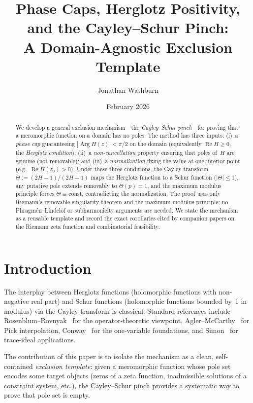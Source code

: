 \documentclass[11pt]{amsart}
\title[Phase Caps and the Cayley--Schur Pinch]{Phase Caps, Herglotz Positivity,\\
and the Cayley--Schur Pinch:\\
A Domain-Agnostic Exclusion Template}
\author{Jonathan Washburn}
\date{February 2026}
\theoremstyle{definition}
\theoremstyle{remark}
\DeclareMathOperator{\re}{Re}
\DeclareMathOperator{\Arg}{Arg}
\begin{document}
\begin{abstract}
We develop a general exclusion mechanism---the \emph{Cayley--Schur pinch}---for
proving that a meromorphic function on a domain has no poles.
The method has three inputs:
(i)~a \emph{phase cap} guaranteeing $|\Arg H(z)|<\pi/2$ on the domain
(equivalently $\re H\ge 0$, the \emph{Herglotz condition});
(ii)~a \emph{non-cancellation} property ensuring that poles of~$H$
are genuine (not removable); and
(iii)~a \emph{normalization} fixing the value at one interior point
(e.g.\ $\re H(z_0)>0$).
Under these three conditions, the Cayley transform
$\Theta:=(2H-1)/(2H+1)$ maps the Herglotz function to a Schur function
($|\Theta|\le 1$), any putative pole extends removably to $\Theta(p)=1$,
and the maximum modulus principle forces $\Theta\equiv\text{const}$,
contradicting the normalization.
The proof uses only Riemann's removable singularity theorem and the
maximum modulus principle; no Phragm\'en--Lindel\"of or subharmonicity
arguments are needed.
We state the mechanism as a reusable template and record the exact
corollaries cited by companion papers on the Riemann zeta function
and combinatorial feasibility.
\end{abstract}

\maketitle

\section{Introduction}\label{sec:intro}

The interplay between Herglotz functions (holomorphic functions with
non-negative real part) and Schur functions (holomorphic functions bounded
by~$1$ in modulus) via the Cayley transform is classical.
Standard references include Rosenblum--Rovnyak~\cite{RR} for the
operator-theoretic viewpoint, Agler--McCarthy~\cite{AM} for Pick
interpolation, Conway~\cite{ConwayII} for the one-variable foundations,
and Simon~\cite{Simon} for trace-ideal applications.

The contribution of this paper is to isolate the mechanism as a clean,
self-contained \emph{exclusion template}: given a meromorphic function
whose pole set encodes some target objects (zeros of a zeta function,
inadmissible solutions of a constraint system, etc.), the Cayley--Schur
pinch provides a systematic way to prove that pole set is empty.
\end{document}
